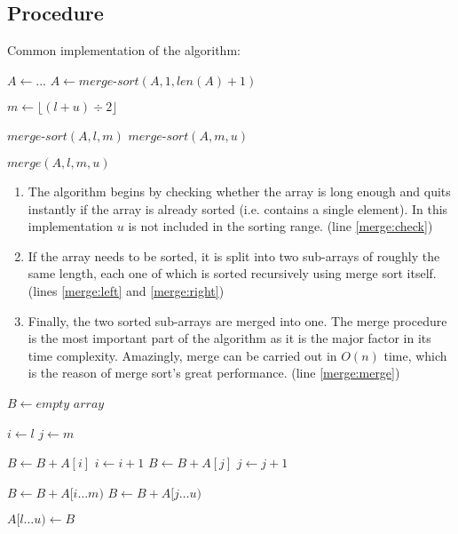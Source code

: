 \documentclass[titlepage, a4paper, 12pt]{article}
\begin{document}
    \subsection{Procedure}

    Common implementation of the algorithm:

    \begin{algorithmic}[1]
        \State $A \gets ...$
        \State $A \gets merge$-$sort(A, 1, len(A) + 1)$

             \label{merge:check}
                \State $m \gets \lfloor (l + u) \div 2 \rfloor$
                
                \State $merge$-$sort(A, l, m)$ \label{merge:left}
                \State $merge$-$sort(A, m, u)$ \label{merge:right}

                \State $merge(A, l, m, u)$ \label{merge:merge}
            \EndIf
        \EndFunction
    \end{algorithmic}

    \begin{enumerate}
        \item The algorithm begins by checking whether the array is long enough and quits instantly if the array is already sorted (i.e. contains a single element). In this implementation $u$ is not included in the sorting range. (line \ref{merge:check})
        \item If the array needs to be sorted, it is split into two sub-arrays of roughly the same length, each one of which is sorted recursively using merge sort itself. (lines \ref{merge:left} and \ref{merge:right})
        \item Finally, the two sorted sub-arrays are merged into one. The merge procedure is the most important part of the algorithm as it is the major factor in its time complexity. Amazingly, merge can be carried out in $O(n)$ time, which is the reason of merge sort's great performance. (line \ref{merge:merge})
    \end{enumerate}

    \begin{algorithmic}[1]
            \State $B \gets empty$ $array$ \label{merge:buffer}

            \State $i \gets l$ \label{merge:i}
            \State $j \gets m$ \label{merge:j}

             \label{merge:join}
                    \State $B \gets B + A[i]$
                    \State $i \gets i + 1$
                \Else
                    \State $B \gets B + A[j]$
                    \State $j \gets j + 1$
                \EndIf
            \EndWhile

            \State $B \gets B + A[i \dots m)$ \label{merge:complete-left}
            \State $B \gets B + A[j \dots u)$ \label{merge:complete-right}

            \State $A[l \dots u) \gets B$ \label{merge:replicate}
        \EndFunction
    \end{algorithmic}
\end{document}
